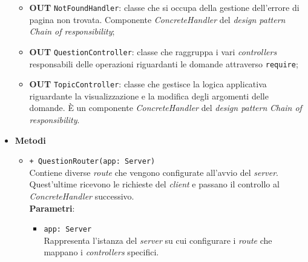 \begin{itemize}
\begin{itemize}
			\item \textbf{OUT} \texttt{NotFoundHandler}: classe che si occupa della gestione dell’errore di pagina non trovata. Componente \textit{ConcreteHandler} del \textit{design pattern} \textit{Chain of responsibility};
			\item \textbf{OUT} \texttt{QuestionController}: classe che raggruppa i vari \textit{controllers} responsabili delle operazioni riguardanti le domande attraverso \texttt{require};
			\item \textbf{OUT} \texttt{TopicController}: classe che gestisce la logica applicativa riguardante la visualizzazione e la modifica degli argomenti delle domande. È un componente \textit{ConcreteHandler} del \textit{design pattern} \textit{Chain of responsibility}.
		\end{itemize}
		\item \textbf{Metodi} \\
		\begin{itemize}
			\item \texttt{+ QuestionRouter(app: Server)}\\
			Contiene diverse \textit{route} che vengono configurate all’avvio del \textit{server}. Quest’ultime ricevono le richieste del \textit{client} e passano il controllo al \textit{ConcreteHandler} successivo.\\
			\textbf{Parametri}:
			\begin{itemize}
				\item \texttt{app: Server}\\
				Rappresenta l’istanza del \textit{server} su cui configurare i \textit{route} che mappano i \textit{controllers} specifici.
			\end{itemize}
		\end{itemize}
	\end{itemize}
